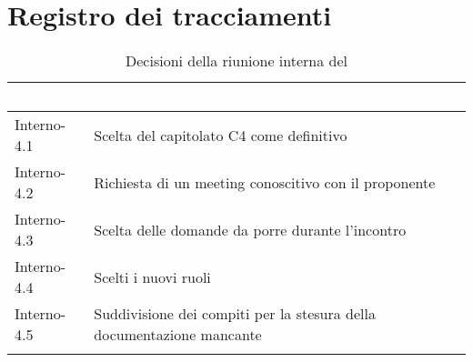 \section{Registro dei tracciamenti}
{

\renewcommand{\arraystretch}{1.5}
\centering
\begin{longtable}{C{3cm} C{9cm}}
\textcolor{white}{\textbf{Codice}}&
\textcolor{white}{\textbf{Decisione}}\\	
\endhead
		
Interno-4.1 & Scelta del capitolato C4 come definitivo\\

Interno-4.2 & Richiesta di un meeting conoscitivo con il proponente\\

Interno-4.3 & Scelta delle domande da porre durante l'incontro\\

Interno-4.4 & Scelti i nuovi ruoli\\

Interno-4.5 & Suddivisione dei compiti per la stesura della documentazione mancante\\
		
\caption{Decisioni della riunione interna del \Data{}}
\end{longtable}
}
